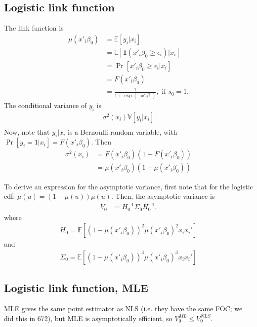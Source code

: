 \documentclass[12pt]{article}
\newcommand{\E}{\mathbb{E}}
\newcommand{\V}{\mathbb{V}}
\newcommand{\e}{\epsilon}
\newcommand{\mtx}[1]{\ensuremath{\bm{\mathit{#1}}}}
\begin{document}
\subsection{Logistic link function}
The link function is
\begin{align*}
\mu(\mtx{x}'_i\mtx{\beta}_0) &=\E[y_i|\mtx{x}_i]\\
&= \E[\bm{1}(\mtx{x}'_i\mtx{\beta}_0 \geq \e_i) |\mtx{x}_i ]\\
&=\Pr[\mtx{x}'_i\mtx{\beta}_0 \geq \e_i |\mtx{x}_i ]\\
&= F(\mtx{x}'_i\mtx{\beta}_0)\\
&= \frac{1}{1+ \exp(-\mtx{x}'_i\mtx{\beta}_0)}, \text{ if } s_0 = 1.
\end{align*}
The conditional variance of $y_i$ is
\begin{align*}
\sigma^2(\mtx{x}_i)  \V[y_i | \mtx{x}_i]\\
\end{align*}
Now, note that $y_i|\mtx{x}_i$ is a Bernoulli random variable, with $\Pr[y_i=1 |\mtx{x}_i] = F(\mtx{x}'_i\mtx{\beta}_0)$. Then
\begin{align*}
\sigma^2(\mtx{x}_i)  &= F(\mtx{x}'_i\mtx{\beta}_0)(1-F(\mtx{x}'_i\mtx{\beta}_0))\\
&= \mu(\mtx{x}'_i\mtx{\beta}_0)(1-\mu(\mtx{x}'_i\mtx{\beta}_0))
\end{align*}

To derive an expression for the asymptotic variance, first note that for the logistic cdf: $\dot \mu(u) = (1-\mu(u))\mu(u)$. Then, the asymptotic variance is 
\begin{align*}
\mtx{V}_0 &= H_0^{-1}\Sigma_0 H_0^{-1}.
\end{align*}
where
\begin{align*}
H_0 = \E[(1-\mu(\mtx{x}'_i\mtx{\beta}_0))^2 \mu(\mtx{x}'_i\mtx{\beta}_0)^2 \mtx{x}_i\mtx{x}_i']
\end{align*}
and
\begin{align*}
\Sigma_0 =  \E[(1-\mu(\mtx{x}'_i\mtx{\beta}_0))^3 \mu(\mtx{x}'_i\mtx{\beta}_0)^3 \mtx{x}_i\mtx{x}_i']
\end{align*}

\subsection{Logistic link function, MLE}
MLE gives the same point estimator as NLS (i.e. they have the same FOC; we did this in 672), but MLE is asymptotically efficient, so $\mtx{V}_0^{ML} \leq \mtx{V}_0^{NLS}$.
\end{document}
